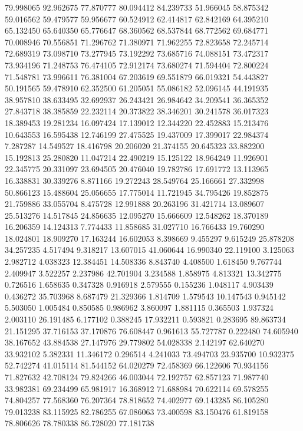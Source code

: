 79.998065
92.962675
77.870777
80.094412
84.239733
51.966045
58.875342
59.016562
59.479577
59.956677
60.524912
62.414817
62.842169
64.395210
65.132450
65.640350
65.776647
68.360562
68.537844
68.772562
69.684771
70.008946
70.556851
71.296762
71.380971
71.962255
72.823658
72.245714
72.689319
73.098710
73.277945
73.192292
73.685716
74.088151
73.472317
73.934196
71.248753
76.474105
72.912174
73.680274
71.594404
72.800224
71.548781
73.996611
76.381004
67.203619
69.551879
66.019321
54.443827
50.191565
59.478910
62.352500
61.205051
55.086182
52.096145
44.191935
38.957810
38.633495
32.692937
26.243421
26.984642
34.209541
36.365352
27.843718
38.385859
22.232114
20.373822
38.346201
30.241578
36.017323
18.389453
19.281234
16.097424
17.139012
12.344220
22.452883
15.213476
10.643553
16.595438
12.746199
27.475525
19.437009
17.399017
22.984374
7.287287
14.549527
18.416798
20.206020
21.374155
20.645323
33.882200
15.192813
25.280820
11.047214
22.490219
15.125122
18.964249
11.926901
22.345775
20.331097
23.694505
20.476040
19.782786
17.691772
13.113965
16.338831
30.339276
8.871166
19.272243
28.549764
25.166661
27.332998
50.866123
15.488604
25.056655
17.775014
11.721945
34.795426
19.852875
21.759886
33.055704
8.475728
12.991888
20.263196
31.421714
13.089607
25.513276
14.517845
24.856635
12.095270
15.666609
12.548262
18.370189
16.206359
14.124313
7.774433
11.858685
31.027710
16.766433
19.760290
18.024801
18.909270
17.163244
16.602053
8.398669
9.455297
9.615249
25.878208
34.257235
4.517494
9.318217
13.607015
41.060644
16.990340
22.119100
3.125063
2.982712
4.038323
12.384451
14.508336
8.843740
4.408500
1.618450
9.767744
2.409947
3.522257
2.237986
42.701904
3.234588
1.858975
4.813321
13.342775
0.726516
1.658635
0.347328
0.916918
2.579555
0.155236
1.048117
4.903439
0.436272
35.703968
8.687479
21.329366
1.814709
1.579543
10.147543
0.945142
5.503050
1.005484
0.850585
0.986962
3.860097
1.881115
0.365503
1.937324
2.003110
26.191485
6.177102
0.388245
17.932211
0.593821
0.283695
89.863734
21.151295
37.716153
37.170876
76.608447
0.961613
55.727787
0.222480
74.605940
38.167652
43.884538
27.147976
29.779802
54.028338
2.142197
62.640270
33.932102
5.382331
11.346172
0.296514
4.241033
73.494703
23.935700
10.932375
52.742274
41.015114
81.544152
64.020279
72.458369
66.122606
70.934156
71.827632
42.708124
79.824266
46.003044
72.192757
62.857123
71.987740
33.982381
69.234499
65.981917
16.368912
71.688984
70.622114
69.578255
74.804257
77.568360
76.207364
78.818652
74.402977
69.143285
86.105280
79.013238
83.115925
82.786255
67.086063
73.400598
83.150476
61.819158
78.806626
78.780338
86.728020
77.181738
